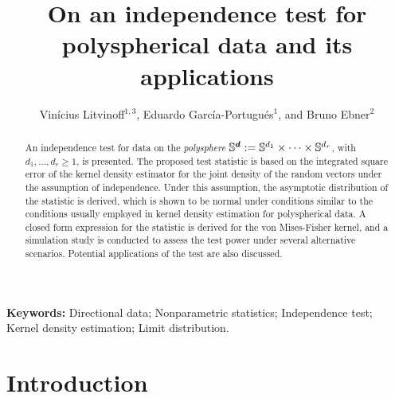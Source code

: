 \documentclass[oneside,11pt]{article}
\newif\ifmain
\begin{document}
\ifmain

\title{On an independence test for polyspherical data and its applications}
\setlength{\droptitle}{-1cm}
\predate{}%
\postdate{}%
\date{}

\author{Vinícius Litvinoff$^{1,3}$, Eduardo García-Portugués$^1$, and Bruno Ebner$^2$}
\maketitle
    
\begin{abstract}
An independence test for data on the \emph{polysphere} $\mathbb{S}^{\boldsymbol{d}} := \mathbb{S}^{d_1} \times \dots \times \mathbb{S}^{d_r}$, with $d_1,\ldots,d_r\geq 1$, is presented. The proposed test statistic is based on the integrated square error of the kernel density estimator for the joint density of the random vectors under the assumption of independence. Under this assumption, the asymptotic distribution of the statistic is derived, which is shown to be normal under conditions similar to the conditions usually employed in kernel density estimation for polyspherical data. A closed form expression for the statistic is derived for the von Mises-Fisher kernel, and a simulation study is conducted to assess the test power under several alternative scenarios. Potential applications of the test are also discussed.
\end{abstract}
\begin{flushleft}
	\small\textbf{Keywords:} Directional data; Nonparametric statistics; Independence test; Kernel density estimation; Limit distribution.
\end{flushleft}

\section{Introduction}
\label{sec:intro}

\end{document}
